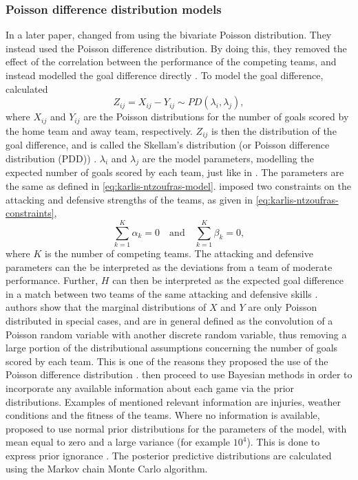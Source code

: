 \subsubsection{Poisson difference distribution models}

In a later paper, \citet{bib:karlis-ntzoufras-2008} changed from using the bivariate Poisson distribution. They instead used the Poisson difference distribution. By doing this, they removed the effect of the correlation between the performance of the competing teams, and instead modelled the goal difference directly \citep{bib:karlis-ntzoufras-2008}. To model the goal difference, \citet{bib:karlis-ntzoufras-2008} calculated
\begin{equation*}
    Z_{ij} = X_{ij} - Y_{ij} \sim PD(\lambda_{i}, \lambda_{j}),
\end{equation*}
where $X_{ij}$ and $Y_{ij}$ are the Poisson distributions for the number of goals scored by the home team and away team, respectively. $Z_{ij}$ is then the distribution of the goal difference, and is called the Skellam's distribution (or Poisson difference distribution (PDD)) \citep{bib:karlis-ntzoufras-2008}. $\lambda_{i}$ and $\lambda_{j}$ are the model parameters, modelling the expected number of goals scored by each team, just like in \citet{bib:karlis-ntzoufras-2003}. The parameters are the same as defined in \cref{eq:karlis-ntzoufras-model}. \citet{bib:karlis-ntzoufras-2008} imposed two constraints on the attacking and defensive strengths of the teams, as given in \cref{eq:karlis-ntzoufras-constraints},
\begin{equation}
    \sum_{k=1}^{K} \alpha_{k} = 0 \quad \text{and} \quad \sum_{k=1}^{K} \beta_{k} = 0,
    \label{eq:karlis-ntzoufras-constraints}
\end{equation}
where $K$ is the number of competing teams. The attacking and defensive parameters can the be interpreted as the deviations from a team of moderate performance. Further, $H$ can then be interpreted as the expected goal difference in a match between two teams of the same attacking and defensive skills \citep{bib:karlis-ntzoufras-2008}. \citet{bib:karlis-ntzoufras-2008} authors show that the marginal distributions of $X$ and $Y$ are only Poisson distributed in special cases, and are in general defined as the convolution of a Poisson random variable with another discrete random variable, thus removing a large portion of the distributional assumptions concerning the number of goals scored by each team. This is one of the reasons they proposed the use of the Poisson difference distribution \citep{bib:karlis-ntzoufras-2008}. \citet{bib:karlis-ntzoufras-2008} then proceed to use Bayesian methods in order to incorporate any available information about each game via the prior distributions. Examples of mentioned relevant information are injuries, weather conditions and the fitness of the teams. Where no information is available, \citet{bib:karlis-ntzoufras-2008} proposed to use normal prior distributions for the parameters of the model, with mean equal to zero and a large variance (for example $10^4$). This is done to express prior ignorance \citep{bib:karlis-ntzoufras-2008}. The posterior predictive distributions are calculated using the Markov chain Monte Carlo algorithm.

